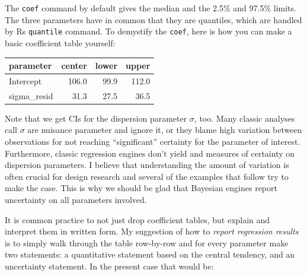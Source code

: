 \documentclass[]{svmono}
\newenvironment{Shaded}{\begin{snugshade}}{\end{snugshade}}
\newcommand{\KeywordTok}[1]{\textcolor[rgb]{0.13,0.29,0.53}{\textbf{#1}}}
\newcommand{\DataTypeTok}[1]{\textcolor[rgb]{0.13,0.29,0.53}{#1}}
\newcommand{\DecValTok}[1]{\textcolor[rgb]{0.00,0.00,0.81}{#1}}
\newcommand{\FloatTok}[1]{\textcolor[rgb]{0.00,0.00,0.81}{#1}}
\newcommand{\StringTok}[1]{\textcolor[rgb]{0.31,0.60,0.02}{#1}}
\newcommand{\OperatorTok}[1]{\textcolor[rgb]{0.81,0.36,0.00}{\textbf{#1}}}
\newcommand{\NormalTok}[1]{#1}
\theoremstyle{definition}
\theoremstyle{definition}
\theoremstyle{definition}
\theoremstyle{remark}
\begin{document}
The \texttt{coef} command by default gives the median and the 2.5\% and
97.5\% limits. The three parameters have in common that they are
quantiles, which are handled by Rs \texttt{quantile} command. To
demystify the \texttt{coef}, here is how you can make a basic
coefficient table yourself:

\begin{Shaded}
\end{Shaded}

\begin{tabular}{l|r|r|r}
\hline
parameter & center & lower & upper\\
\hline
Intercept & 106.0 & 99.9 & 112.0\\
\hline
sigma\_resid & 31.3 & 27.5 & 36.5\\
\hline
\end{tabular}

Note that we get CIs for the dispersion parameter \(\sigma\), too. Many
classic analyses call \(\sigma\) are nuisance parameter and ignore it,
or they blame high variation between observations for not reaching
``significant'' certainty for the parameter of interest. Furthermore,
classic regression engines don't yield and measures of certainty on
dispersion parameters. I believe that understanding the amount of
variation is often crucial for design research and several of the
examples that follow try to make the case. This is why we should be glad
that Bayesian engines report uncertainty on all parameters involved.

It is common practice to not just drop coefficient tables, but explain
and interpret them in written form. My suggestion of how to \emph{report
regression results} is to simply walk through the table row-by-row and
for every parameter make two statements: a quantitative statement based
on the central tendency, and an uncertainty statement. In the present
case that would be:
\end{document}
